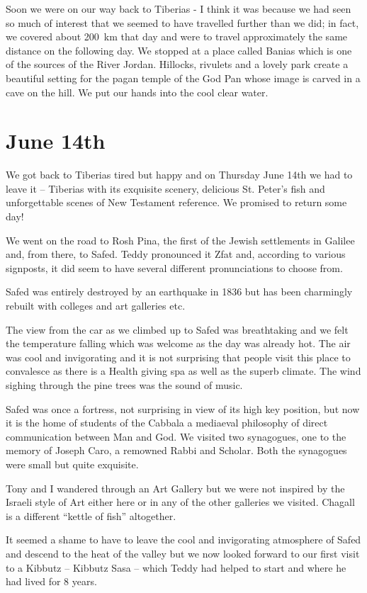 Soon we were on our way back to Tiberias - I think it was because we
had seen so much of interest that we seemed to have travelled further
than we did; in fact, we covered about 200~km that day and were to
travel approximately the same distance on the following day. We
stopped at a place called Banias which is one of the sources of the
River Jordan. Hillocks, rivulets and a lovely park create a beautiful
setting for the pagan temple of the God Pan whose image is carved in a
cave on the hill. We put our hands into the cool clear water.


\section{June 14th}

We got back to Tiberias tired but happy and on Thursday June 14th we
had to leave it -- Tiberias with its exquisite scenery, delicious
St. Peter's fish and unforgettable scenes of New Testament
reference. We promised to return some day!

We went on the road to Rosh Pina, the first of the Jewish settlements
in Galilee and, from there, to Safed. Teddy pronounced it Zfat and,
according to various signposts, it did seem to have several different
pronunciations to choose from.

Safed was entirely destroyed by an earthquake in 1836 but has been
charmingly rebuilt with colleges and art galleries etc.

The view from the car as we climbed up to Safed was breathtaking and
we felt the temperature falling which was welcome as the day was
already hot. The air was cool and invigorating and it is not
surprising that people visit this place to convalesce as there is a
Health giving spa as well as the superb climate. The wind sighing
through the pine trees was the sound of music.

Safed was once a fortress, not surprising in view of its high key
position, but now it is the home of students of the Cabbala a
mediaeval philosophy of direct communication between Man and God. We
visited two synagogues, one to the memory of Joseph Caro, a remowned
Rabbi and Scholar. Both the synagogues were small but quite exquisite.

Tony and I wandered through an Art Gallery but we were not inspired by
the Israeli style of Art either here or in any of the other galleries
we visited. Chagall is a different ``kettle of fish'' altogether.

It seemed a shame to have to leave the cool and invigorating
atmosphere of Safed and descend to the heat of the valley but we now
looked forward to our first visit to a Kibbutz -- Kibbutz Sasa --
which Teddy had helped to start and where he had lived for 8 years.

